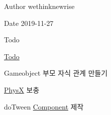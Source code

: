 \begin{DoxyAuthor}{Author}
wethinknewrise 
\end{DoxyAuthor}
\begin{DoxyDate}{Date}
2019-\/11-\/27 
\end{DoxyDate}
\begin{DoxyRefDesc}{Todo}
\item[\mbox{\hyperlink{todo__todo000002}{Todo}}]
\begin{DoxyItemize}
\item Gameobject 부모 자식 관계 만들기
\item \mbox{\hyperlink{class_phys_x}{PhysX}} 보충
\item do\+Tween \mbox{\hyperlink{class_component}{Component}} 제작 
\end{DoxyItemize}\end{DoxyRefDesc}

